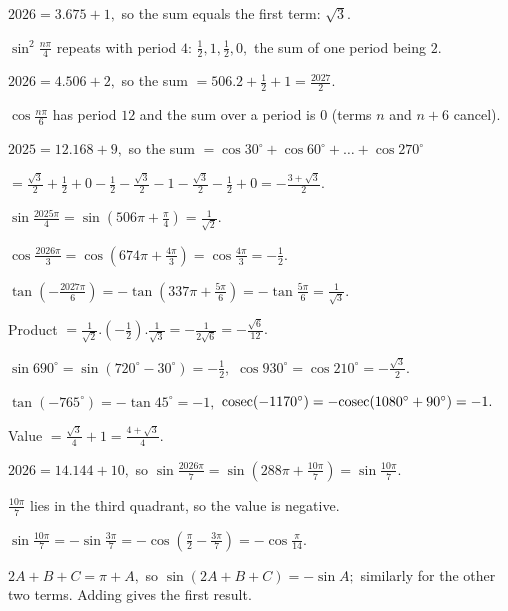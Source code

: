   $2026 = 3.675 + 1,$ so the sum equals the first term: $\sqrt{3}.$

\item $\sin^2\frac{n\pi}{4}$ repeats with period $4$: $\frac{1}{2}, 1, \frac{1}{2}, 0,$ the sum of one period being $2.$

  $2026 = 4.506 + 2,$ so the sum $= 506.2 + \frac{1}{2} + 1 = \frac{2027}{2}.$

\item $\cos\frac{n\pi}{6}$ has period $12$ and the sum over a period is $0$ (terms $n$ and $n + 6$ cancel).

  $2025 = 12.168 + 9,$ so the sum $= \cos 30^\circ + \cos 60^\circ + \ldots + \cos 270^\circ$

  $= \frac{\sqrt{3}}{2} + \frac{1}{2} + 0 - \frac{1}{2} - \frac{\sqrt{3}}{2} - 1 - \frac{\sqrt{3}}{2} - \frac{1}{2} + 0 =
  -\frac{3 + \sqrt{3}}{2}.$

\item $\sin\frac{2025\pi}{4} = \sin\left(506\pi + \frac{\pi}{4}\right) = \frac{1}{\sqrt{2}}.$

  $\cos\frac{2026\pi}{3} = \cos\left(674\pi + \frac{4\pi}{3}\right) = \cos\frac{4\pi}{3} = -\frac{1}{2}.$

  $\tan\left(-\frac{2027\pi}{6}\right) = -\tan\left(337\pi + \frac{5\pi}{6}\right) = -\tan\frac{5\pi}{6} = \frac{1}{\sqrt{3}}.$

  Product $= \frac{1}{\sqrt{2}}.\left(-\frac{1}{2}\right).\frac{1}{\sqrt{3}} = -\frac{1}{2\sqrt{6}} = -\frac{\sqrt{6}}{12}.$

\item $\sin 690^\circ = \sin(720^\circ - 30^\circ) = -\frac{1}{2},$ $\cos 930^\circ = \cos 210^\circ = -\frac{\sqrt{3}}{2}.$

  $\tan(-765^\circ) = -\tan 45^\circ = -1,$ ${\rm cosec}(-1170^\circ) = -{\rm cosec}(1080^\circ + 90^\circ) = -1.$

  Value $= \frac{\sqrt{3}}{4} + 1 = \frac{4 + \sqrt{3}}{4}.$

\item $2026 = 14.144 + 10,$ so $\sin\frac{2026\pi}{7} = \sin\left(288\pi + \frac{10\pi}{7}\right) = \sin\frac{10\pi}{7}.$

  $\frac{10\pi}{7}$ lies in the third quadrant, so the value is negative.

  $\sin\frac{10\pi}{7} = -\sin\frac{3\pi}{7} = -\cos\left(\frac{\pi}{2} - \frac{3\pi}{7}\right) = -\cos\frac{\pi}{14}.$

\item $2A + B + C = \pi + A,$ so $\sin(2A + B + C) = -\sin A;$ similarly for the other two terms. Adding gives the first result.

